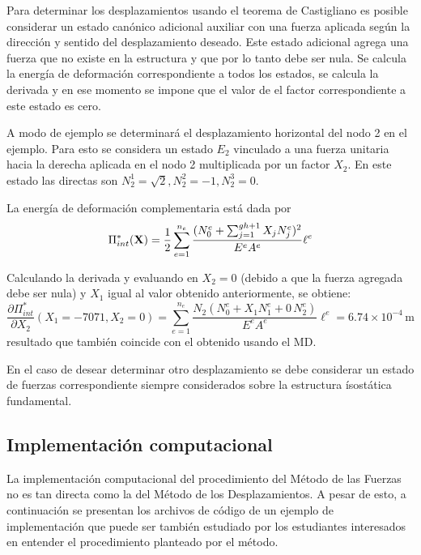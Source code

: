 Para determinar los desplazamientos usando el teorema de Castigliano es posible considerar un estado canónico adicional auxiliar con una fuerza aplicada según la dirección y sentido del desplazamiento deseado. %
%
Este estado adicional agrega una fuerza que no existe en la estructura y que por lo tanto debe ser nula. Se calcula la energía de deformación correspondiente a todos los estados, se calcula la derivada y en ese momento se impone que el valor de el factor correspondiente a este estado es cero.

A modo de ejemplo se determinará el desplazamiento horizontal del nodo 2 en el ejemplo. %
%
Para esto se considera un estado $E_2$ vinculado a una fuerza unitaria hacia la derecha aplicada en el nodo 2 multiplicada por un factor $X_2$. %
%
En este estado las directas son $N_2^1 = \sqrt{2}, N_2^2 = -1, N_2^3 = 0$.


La energía de deformación complementaria está dada por
%
\begin{equation}
\Pi_{int}^*({\bf X}) = \frac{1}{2}  \sum_{e=1}^{n_e} \frac{(N_0^e +   \sum_{j=1}^{gh+1}  X_j N_j^e)^2}{E^e A^e} \ell^e 
\end{equation}

Calculando la derivada y evaluando en $X_2=0$ (debido a que la fuerza agregada debe ser nula) y $X_1$ igual al valor obtenido anteriormente, se obtiene:
\begin{equation}
\frac{\partial \Pi_{int}^*}{\partial X_2} (X_1=-7071,X_2=0) =  \sum_{e=1}^{n_e} \frac{N_2 (N_0^e +  X_1 N_1^e + 0 \, N_2^e  )}{E^e A^e} \ell^e  = 6.74 \times 10^{-4} \, \text{m}
\end{equation}
resultado que también coincide con el obtenido usando el MD.


En el caso de desear determinar otro desplazamiento se debe considerar un estado de fuerzas correspondiente siempre considerados sobre la estructura ísostática fundamental.

\subsection{Implementación computacional}

La implementación computacional del procedimiento del Método de las Fuerzas no es tan directa como la del Método de los Desplazamientos. %
%
A pesar de esto, a continuación se presentan los archivos de código de un ejemplo de implementación que puede ser también estudiado por los estudiantes interesados en entender el procedimiento planteado por el método.

